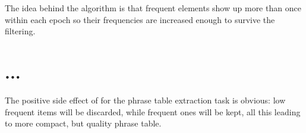The idea behind the algorithm is that frequent elements show up more than once
within each epoch so their frequencies are increased enough to survive the
filtering.

\section{...}

The positive side effect of  for the phrase table extraction task is
obvious: low frequent items will be discarded, while frequent ones will be kept, all this
leading to more compact, but quality phrase table.
